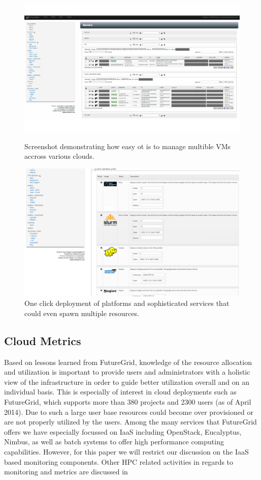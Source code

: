 \documentclass{tex/sig-alternate-2013}
\newcommand{\todo}[1]{{\color{red}{#1}}}
\begin{document}
{\begin{figure}[htb]
  \centering
    \includegraphics[width=1.0\columnwidth]{images/instances.pdf}
  \caption{Screenshot demonstrating how easy ot is to manage multible VMs accross various clouds.}\label{F:instances}
  \centering
    \includegraphics[width=1.0\columnwidth]{images/oneclick.pdf}
  \caption{One click deployment of platforms and sophisticated
    services that could even spawn multiple resources.}\label{F:oneclick}
\end{figure}

\subsection{Cloud Metrics}

\todo{READ}

Based on lessons learned from FutureGrid, knowledge of the resource
allocation and utilization is important to provide users and
administrators with a holistic view of the infrastructure in order to
guide better utilization overall and on an individual basis. This is
especially of interest in cloud deployments such as FutureGrid, which
supports more than 380 projects and 2300 users (as of April 2014). Due
to such a large user base resources could become over provisioned or
are not properly utilized by the users. Among the many services that
FutureGrid offers we have especially focussed on IaaS including
OpenStack, Eucalyptus, Nimbus, as well as batch systems to offer high
performance computing capabilities.  However, for this paper we will
restrict our discussion on the IaaS based monitoring components.
Other HPC related activities in regards to monitoring and metrics are
discussed in
\cite{ubmod,las12xdmod-kernel,las12xdmod-planing,las13xdmod,smith13info}

}
\end{document}
